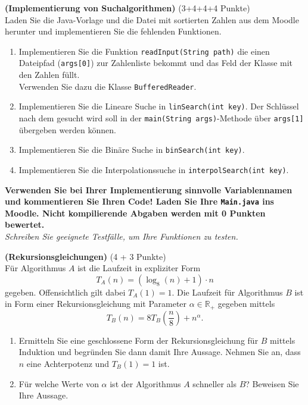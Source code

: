 \documentclass{article}
\begin{document}
  \quad\textbf{(Implementierung von Suchalgorithmen)} \quad(3+4+4+4 Punkte)\\
Laden Sie die Java-Vorlage und die Datei mit sortierten Zahlen aus dem Moodle herunter und implementieren Sie die fehlenden Funktionen.
\begin{enumerate}
\item Implementieren Sie die Funktion \texttt{readInput(String path)} die einen Dateipfad (\texttt{args[0]}) zur Zahlenliste bekommt und das Feld der Klasse mit den Zahlen füllt.\\
Verwenden Sie dazu die Klasse \texttt{BufferedReader}.
\item Implementieren Sie die Lineare Suche in \texttt{linSearch(int key)}. Der Schlüssel nach dem gesucht wird soll in der \texttt{main(String args)}-Methode über \texttt{args[1]} übergeben werden können.
\item Implementieren Sie die Binäre Suche in \texttt{binSearch(int key)}.
\item Implementieren Sie die Interpolationssuche in \texttt{interpolSearch(int key)}.
\end{enumerate}
{\color{red} \bf Verwenden Sie bei Ihrer Implementierung sinnvolle Variablennamen und kommentieren Sie Ihren Code! Laden Sie Ihre \texttt{Main.java} ins Moodle. Nicht kompilierende Abgaben werden \textbf{mit 0 Punkten} bewertet.}\\
\textit{Schreiben Sie geeignete Testfälle, um Ihre Funktionen zu testen.}


\bigskip
{}  \quad\textbf{(Rekursionsgleichungen)} \quad(4 + 3 Punkte) \\
Für Algorithmus $A$ ist die Laufzeit in expliziter Form
\[
T_A(n) = (\log_8(n) + 1) \cdot n
\]
gegeben.
Offensichtlich gilt dabei $T_A(1) = 1$.
Die Laufzeit für Algorithmus $B$ ist in Form einer Rekursionsgleichung mit Parameter $\alpha \in \mathbb{R}_+$ gegeben mittels
\[
T_B(n) = 8 T_B\left(\frac{n}{8}\right)  + n^{\alpha}.
\]
\begin{enumerate}
  \item Ermitteln Sie eine geschlossene Form der Rekursionsgleichung für $B$ mittels Induktion und begründen Sie dann damit Ihre Aussage. Nehmen Sie an, dass $n$ eine Achterpotenz und $T_B(1)=1$ ist.
  \item Für welche Werte von $\alpha$ ist der Algorithmus $A$ schneller als $B$? Beweisen Sie Ihre Aussage. 
\end{enumerate}
\end{document}
